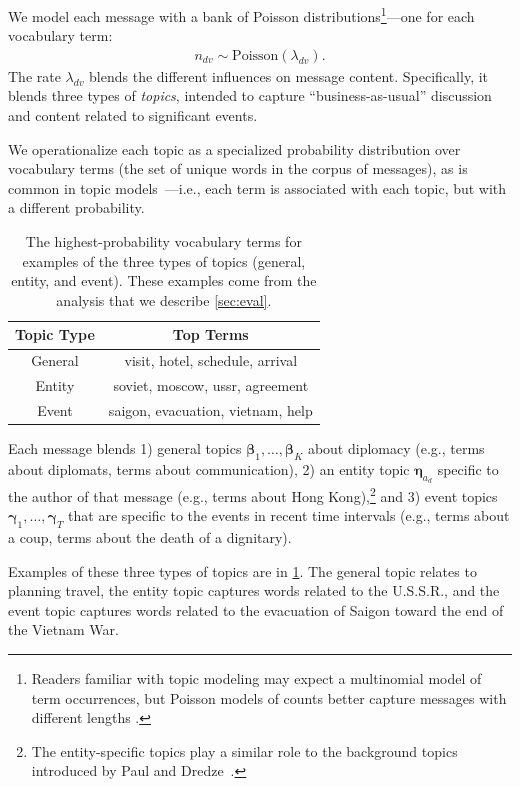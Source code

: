 We model each message with a bank of Poisson
distributions\footnote{Readers familiar with topic modeling may expect
  a multinomial model of term occurrences, but Poisson models of
  counts better capture messages with different lengths
  \cite{canny2004gap}.}---one for
each vocabulary term:
\begin{align}
  n_{dv} \sim \textrm{Poisson}\left(\lambda_{dv}\right).
\end{align}
The rate $\lambda_{dv}$ blends the different influences on message
content. Specifically, it blends three types of \emph{topics},
intended to capture ``business-as-usual'' discussion and content
related to significant events.

We operationalize each topic as a specialized probability distribution
over vocabulary terms (the set of unique words in the corpus of
messages), as is common in topic
models~\cite{Blei:2003,canny2004gap,Gopalan:2014b}---i.e., each term
is associated with each topic, but with a different probability.

\begin{table}
\centering
\small
\begin{tabular}{cc}
\toprule
\textbf{Topic Type} & \textbf{Top Terms} \\
\midrule
General & visit, hotel, schedule, arrival \\
Entity & soviet, moscow, ussr, agreement \\
Event & saigon, evacuation, vietnam, help \\
\bottomrule
\end{tabular}
\caption{The highest-probability vocabulary terms for examples of the
  three types of topics (general, entity, and event). These examples
  come from the analysis that we describe \cref{sec:eval}.}
\label{tab:3topics}
\end{table}

Each message blends 1) general topics $\mathbold{\beta}_1, \ldots,
\mathbold{\beta}_K$ about diplomacy (e.g., terms about diplomats,
terms about communication), 2) an entity topic $\mathbold{\eta}_{a_d}$
specific to the author of that message (e.g., terms about
Hong Kong),\footnote{The entity-specific topics play a similar role to the
  background topics introduced by Paul and
  Dredze~.} and 3) event topics
$\mathbold{\gamma}_1, \ldots, \mathbold{\gamma}_T$ that are specific
to the events in recent time intervals (e.g., terms about a coup,
terms about the death of a dignitary).

Examples of these three types of topics are in \cref{tab:3topics}. The
general topic relates to planning travel, the entity topic captures
words related to the U.S.S.R., and the event topic captures words
related to the evacuation of Saigon toward the end of the Vietnam War.


